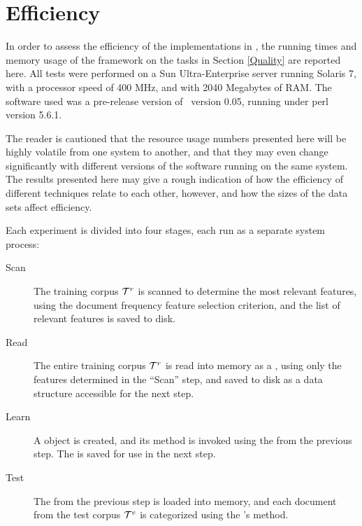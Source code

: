 \section{Efficiency}
\label{Efficiency}

In order to assess the efficiency of the implementations in \aicat,
the running times and memory usage of the framework on the tasks in
Section \ref{Quality} are reported here.  All tests were performed on
a Sun Ultra-Enterprise server running Solaris 7, with a processor
speed of 400 MHz, and with 2040 Megabytes of RAM.  The software used
was a pre-release version of \aicat\ version 0.05, running under perl
version 5.6.1.

The reader is cautioned that the resource usage numbers presented here
will be highly volatile from one system to another, and that they may
even change significantly with different versions of the software
running on the same system.  The results presented here may give a
rough indication of how the efficiency of different techniques relate
to each other, however, and how the sizes of the data sets affect
efficiency.

Each experiment is divided into four stages, each run as a separate
system process:

\begin{description}
\item[Scan] The training corpus $\mathcal{T}^r$ is scanned to determine the
  most relevant features, using the document frequency feature
  selection criterion, and the list of relevant features is saved to
  disk.
\item[Read] The entire training corpus $\mathcal{T}^r$ is read into memory as
  a , using only the features determined in the
  ``Scan'' step, and saved to disk as a data structure accessible for the
  next step.
\item[Learn] A  object is created, and its
   method is invoked using the  from
  the previous step.  The  is saved for use in the next
  step.
\item[Test] The  from the previous step is loaded into
  memory, and each document from the test corpus $\mathcal{T}^e$ is
  categorized using the 's  method.
\end{description}

